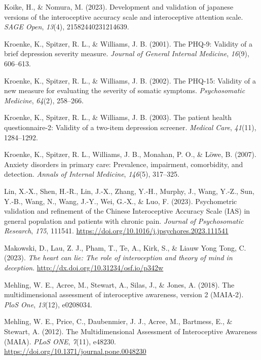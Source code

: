 \documentclass[
  man,
  floatsintext,
  longtable,
  nolmodern,
  notxfonts,
  notimes,
  colorlinks=true,linkcolor=blue,citecolor=blue,urlcolor=blue]{apa7}
\newlength{\cslhangindent}
\newenvironment{CSLReferences}[2] %
 {\begin{list}{}{%
  \setlength{\itemindent}{0pt}
  \setlength{\leftmargin}{0pt}
  \setlength{\parsep}{0pt}
  \ifodd #1
   \setlength{\leftmargin}{\cslhangindent}
   \setlength{\itemindent}{-1\cslhangindent}
  \fi
  \setlength{\itemsep}{#2\baselineskip}}}
 {\end{list}}
\begin{document}
\begin{CSLReferences}{1}{0}
Koike, H., \& Nomura, M. (2023). Development and validation of japanese
versions of the interoceptive accuracy scale and interoceptive attention
scale. \emph{SAGE Open}, \emph{13}(4), 21582440231214639.

Kroenke, K., Spitzer, R. L., \& Williams, J. B. (2001). The PHQ-9:
Validity of a brief depression severity measure. \emph{Journal of
General Internal Medicine}, \emph{16}(9), 606--613.

Kroenke, K., Spitzer, R. L., \& Williams, J. B. (2002). The PHQ-15:
Validity of a new measure for evaluating the severity of somatic
symptoms. \emph{Psychosomatic Medicine}, \emph{64}(2), 258--266.

Kroenke, K., Spitzer, R. L., \& Williams, J. B. (2003). The patient
health questionnaire-2: Validity of a two-item depression screener.
\emph{Medical Care}, \emph{41}(11), 1284--1292.

Kroenke, K., Spitzer, R. L., Williams, J. B., Monahan, P. O., \& Löwe,
B. (2007). Anxiety disorders in primary care: Prevalence, impairment,
comorbidity, and detection. \emph{Annals of Internal Medicine},
\emph{146}(5), 317--325.

Lin, X.-X., Shen, H.-R., Lin, J.-X., Zhang, Y.-H., Murphy, J., Wang,
Y.-Z., Sun, Y.-B., Wang, N., Wang, J.-Y., Wei, G.-X., \& Luo, F. (2023).
Psychometric validation and refinement of the Chinese Interoceptive
Accuracy Scale (IAS) in general population and patients with chronic
pain. \emph{Journal of Psychosomatic Research}, \emph{175}, 111541.
\url{https://doi.org/10.1016/j.jpsychores.2023.111541}

Makowski, D., Lau, Z. J., Pham, T., Te, A., Kirk, S., \& Liauw Yong
Tong, C. (2023). \emph{The heart can lie: The role of interoception and
theory of mind in deception}.
\url{http://dx.doi.org/10.31234/osf.io/p342w}

Mehling, W. E., Acree, M., Stewart, A., Silas, J., \& Jones, A. (2018).
The multidimensional assessment of interoceptive awareness, version 2
(MAIA-2). \emph{PloS One}, \emph{13}(12), e0208034.

Mehling, W. E., Price, C., Daubenmier, J. J., Acree, M., Bartmess, E.,
\& Stewart, A. (2012). The Multidimensional Assessment of Interoceptive
Awareness (MAIA). \emph{PLoS ONE}, \emph{7}(11), e48230.
\url{https://doi.org/10.1371/journal.pone.0048230}


\end{CSLReferences}
\end{document}
